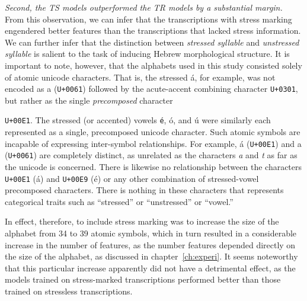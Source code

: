 \emph{Second, the TS models outperformed the TR models by a substantial margin.} From this observation, we can infer that
the transcriptions with stress marking  engendered better features than the
transcriptions that lacked stress information. We can further infer that the distinction between \emph{stressed syllable} and \emph{unstressed syllable} is salient to the task of inducing Hebrew morphological structure. 
It is important to note, however, that the 
alphabets used in this study consisted solely of atomic unicode characters. 
That is, the stressed \textsf{\'a}, 
for example, was not encoded as \textsf{a} (\texttt{U+0061}) followed 
by the acute-accent combining character \texttt{U+0301}, but 
rather as the single \emph{precomposed} character{\texttt{U+00E1}. 
The stressed (or accented) vowels \texttt{\'e}, \textsf{\'o}, and \textsf{\'u} were similarly each represented as a single, precomposed unicode character. 
Such atomic symbols are incapable of expressing inter-symbol relationships. 
For example, \textsf{\'a} (\texttt{U+00E1}) and \textsf{a} (\texttt{U+0061}) 
are completely distinct, as unrelated as the characters \textit{a} and \textit{t} as far as the unicode is concerned.
There is likewise
no relationship between the characters \texttt{U+00E1} (\textsf{\'a}) and  
\texttt{U+00E9} (\textsf{\'e}) or any other combination of stressed-vowel 
precomposed characters. There is nothing in these characters that represents 
categorical traits such as ``stressed'' or ``unstressed'' or ``vowel.''  

In effect, therefore, to include stress marking was to increase the size of the 
alphabet from 34 to 39 atomic symbols, which
in turn resulted in a considerable increase in the number of features, as the number features depended 
directly on the size of the alphabet, as discussed in chapter~\ref{ch:experi}. 
It seems noteworthy 
that this particular increase apparently did not have a detrimental effect, %
as the models trained on stress-marked transcriptions
performed better than those trained on stressless transcriptions.  

}
